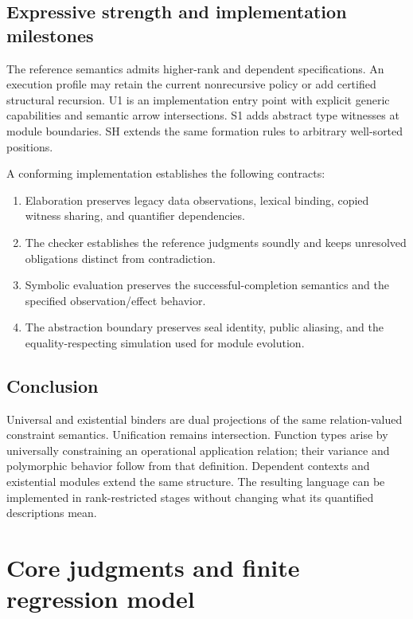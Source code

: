 \documentclass[11pt,a4paper,oneside]{report}
\newcommand{\Uone}{\ensuremath{\profilecal{U}_{1}}}
\newcommand{\Sone}{\ensuremath{\profilecal{S}_{1}}}
\newcommand{\Shigher}{\ensuremath{\profilecal{S}_{H}}}
\def\Uone{U1}%
\def\Sone{S1}%
\def\Shigher{SH}%
\theoremstyle{remark}
\begin{document}
\section{Expressive strength and implementation milestones}
The reference semantics admits higher-rank and dependent specifications. An
execution profile may retain the current nonrecursive policy or add certified
structural recursion. \Uone{} is an implementation entry point with explicit generic
capabilities and semantic arrow intersections. \Sone{} adds abstract type witnesses
at module boundaries. \Shigher{} extends the same formation rules to arbitrary
well-sorted positions.

A conforming implementation establishes the following contracts:
\begin{enumerate}
\item Elaboration preserves legacy data observations, lexical binding, copied
witness sharing, and quantifier dependencies.
\item The checker establishes the reference judgments soundly and keeps
unresolved obligations distinct from contradiction.
\item Symbolic evaluation preserves the successful-completion semantics and the
specified observation/effect behavior.
\item The abstraction boundary preserves seal identity, public aliasing, and
the equality-respecting simulation used for module evolution.
\end{enumerate}

\section{Conclusion}
Universal and existential binders are dual projections of the same relation-valued
constraint semantics. Unification remains intersection. Function types arise by
universally constraining an operational application relation; their variance and
polymorphic behavior follow from that definition. Dependent contexts and
existential modules extend the same structure. The resulting language can be
implemented in rank-restricted stages without changing what its quantified
descriptions mean.

\appendix
\chapter{Core judgments and finite regression model}
\label{app:core}
\end{document}
